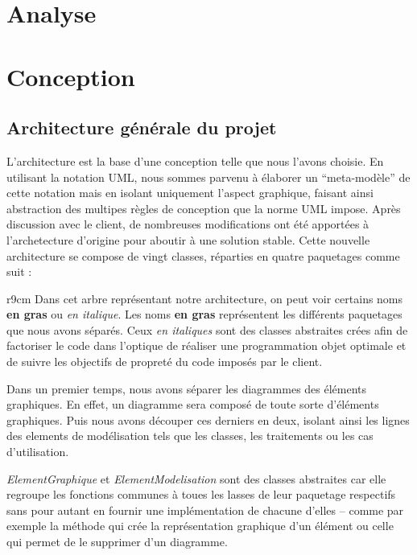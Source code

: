 \documentclass[12pt,a4paper,openany]{report}
\begin{document}
\setcounter{tocdepth}{4}
	\maketitle
	\newpage
	\tableofcontents
	\newpage
	\chapter{Analyse}
	\chapter{Conception}
	\section{Architecture générale du projet}
		L'architecture est la base d'une conception telle que nous l'avons choisie. En utilisant la notation UML, 
		nous sommes parvenu à élaborer un ``meta-modèle'' de cette notation mais en isolant uniquement l'aspect 
		graphique, faisant ainsi abstraction des multipes règles de conception que la norme UML impose. Après 
		discussion avec le client, de nombreuses modifications ont été apportées à l'archetecture d'origine 
		pour aboutir à une solution stable. Cette nouvelle architecture se compose de vingt classes, réparties 
		en quatre paquetages comme suit :
	\newline
	\begin{wrapfigure}{r}{9cm}
		Dans cet arbre représentant notre architecture, on peut voir certains noms \textbf{en gras} ou \textit{en italique}. 
		Les noms \textbf{en gras} représentent les différents paquetages que nous avons séparés. Ceux \textit{en italiques} 
		sont des classes abstraites crées afin de factoriser le code dans l'optique de réaliser une programmation objet optimale 
		et de suivre les objectifs de propreté du code imposés par le client.\vspace{2px}
		
		Dans un premier temps, nous avons séparer les diagrammes des éléments graphiques. En effet, un diagramme sera composé de
		toute sorte d'éléments graphiques. Puis nous avons découper ces derniers en deux, isolant ainsi les lignes des elements
		de modélisation tels que les classes, les traitements ou les cas d'utilisation.\vspace{2px}
		
		\textit{ElementGraphique} et \textit{ElementModelisation} sont des classes abstraites car elle regroupe les fonctions communes
		à toues les lasses de leur paquetage respectifs sans pour autant en fournir une implémentation de chacune d'elles -- comme par exemple la méthode qui crée la
		représentation graphique d'un élément ou celle qui permet de le supprimer d'un diagramme.
	\end{wrapfigure}
\end{document}
